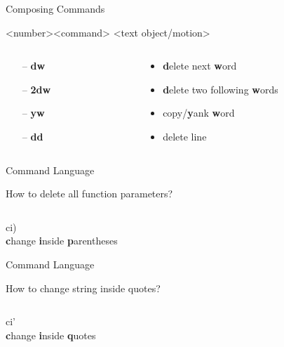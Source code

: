 \documentclass{beamer}
\begin{document}
\begin{frame}{Composing Commands}
    \begin{center}
        \large \textless number\textgreater \textless command\textgreater
        \textless text object/motion\textgreater
    \end{center}
    \begin{columns}
        \begin{column}{0.2\textwidth}
            \begin{itemize}
                \item[--] \textbf{dw}
                \item[--] \textbf{2dw}
                \item[--] \textbf{yw}
                \item[--] \textbf{dd}
            \end{itemize}
        \end{column}
        \begin{column}{0.5\textwidth}
            \begin{itemize}
                \item \textbf{d}elete next \textbf{w}ord
                \item \textbf{d}elete two following \textbf{w}ords
                \item copy/\textbf{y}ank \textbf{w}ord
                \item delete line
            \end{itemize}
        \end{column}
    \end{columns}
\end{frame}

\begin{frame}{Command Language}
    \begin{block}{How to delete all function parameters?}
    \end{block}
    \inputminted{js}{codes/changeInsideParentheses.js}
    \pause
    \begin{center}
        \huge
        ci)
        \\
        \textbf{c}hange \textbf{i}nside \textbf{p}arentheses
    \end{center}
\end{frame}

\begin{frame}{Command Language}
    \begin{block}{How to change string inside quotes?}
    \end{block}
    \inputminted{js}{codes/changeInsideQuotes.js}
    \pause
    \begin{center}
        \huge
        ci'
        \\
        \textbf{c}hange \textbf{i}nside \textbf{q}uotes
    \end{center}
\end{frame}
\end{document}
